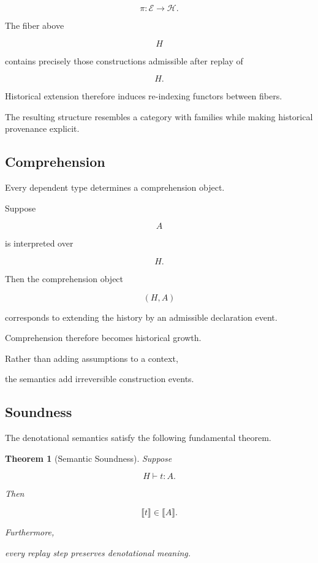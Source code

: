 \documentclass[12pt,oneside]{article}
\newtheorem{theorem}{Theorem}[section]
\theoremstyle{definition}
\theoremstyle{remark}
\begin{document}
\[
\pi
:
\mathcal E
\rightarrow
\mathcal H.
\]

The fiber above

\[
H
\]

contains precisely those constructions admissible after replay of

\[
H.
\]

Historical extension therefore induces re-indexing functors between fibers.

The resulting structure resembles a category with families while making
historical provenance explicit.


\subsection{Comprehension}

Every dependent type determines a comprehension object.

Suppose

\[
A
\]

is interpreted over

\[
H.
\]

Then the comprehension object

\[
(H,A)
\]

corresponds to extending the history by an admissible declaration event.

Comprehension therefore becomes historical growth.

Rather than adding assumptions to a context,

the semantics add irreversible construction events.


\subsection{Soundness}

The denotational semantics satisfy the following fundamental theorem.

\begin{theorem}[Semantic Soundness]

Suppose

\[
H
\vdash
t
:
A.
\]

Then

\[
\llbracket
t
\rrbracket
\in
\llbracket
A
\rrbracket.
\]

Furthermore,

every replay step preserves denotational meaning.

\end{theorem}
\end{document}
